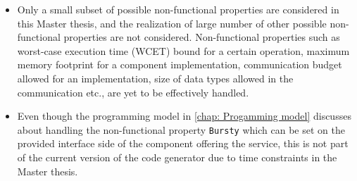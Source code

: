 \begin{itemize}
\item Only a small subset of possible non-functional properties are considered in this Master thesis, and the realization of large number of other possible non-functional properties are not considered. Non-functional properties such as worst-case execution time (WCET) bound for a certain operation, maximum memory footprint for a component implementation, communication budget allowed for an implementation, size of data types allowed in the communication etc., are yet to be effectively handled.
\item Even though the programming model in \cref{chap: Progamming model} discusses about handling the non-functional property \texttt{Bursty} which can be set on the provided interface side of the component offering the service, this is not part of the current version of the code generator due to time constraints in the Master thesis.       
\end{itemize} 
\label{section: Future work}

